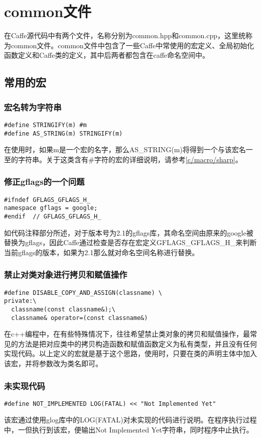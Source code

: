 \chapter{common文件}
在Caffe源代码中有两个文件，名称分别为common.hpp和common.cpp，这里统称为common文件。common文件中包含了一些Caffe中常使用的宏定义、全局初始化函数定义和Caffe类的定义，其中后两者都包含在caffe命名空间中。
\section{常用的宏}
\subsection{宏名转为字符串}
\begin{verbatim}
#define STRINGIFY(m) #m
#define AS_STRING(m) STRINGIFY(m)
\end{verbatim}
在使用时，如果m是一个宏的名字，那么AS\_STRING(m)将得到一个与该宏名一至的字符串。关于这类含有\#字符的宏的详细说明，请参考\ref{c/macro/sharp}。
\subsection{修正gflags的一个问题}
\begin{verbatim}
#ifndef GFLAGS_GFLAGS_H_
namespace gflags = google;
#endif  // GFLAGS_GFLAGS_H_
\end{verbatim}
如代码注释部分所述，对于版本号为2.1的gflags库，其命名空间由原来的google被替换为gflags，因此Caffe通过检查是否存在宏定义GFLAGS\_GFLAGS\_H\_来判断当前gflags的版本，如果为2.1那么就对命名空间名称进行替换。
\subsection{禁止对类对象进行拷贝和赋值操作}\label{common/macro/discpy}
\begin{verbatim}
#define DISABLE_COPY_AND_ASSIGN(classname) \
private:\
  classname(const classname&);\
  classname& operator=(const classname&)
\end{verbatim}
在c++编程中，在有些特殊情况下，往往希望禁止类对象的拷贝和赋值操作，最常见的方法是把对应类中的拷贝构造函数和赋值函数定义为私有类型，并且没有任何实现代码。以上定义的宏就是基于这个思路，使用时，只要在类的声明主体中加入该宏，并将参数改为类名即可。
\subsection{未实现代码}\label{common/macro/notimpl}
\begin{verbatim}
#define NOT_IMPLEMENTED LOG(FATAL) << "Not Implemented Yet"
\end{verbatim}
该宏通过使用glog库中的LOG(FATAL)对未实现的代码进行说明。在程序执行过程中，一但执行到该宏，便输出Not Implemented Yet字符串，同时程序中止执行。
